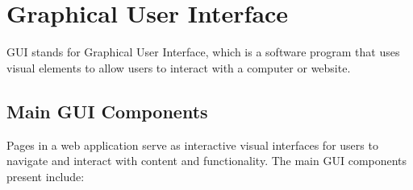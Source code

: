 \documentclass[11pt]{report}
\begin{document}
\begin{itemize}
    
\end{itemize}


\chapter{Graphical User Interface}
GUI stands for Graphical User Interface, which is a software program that uses visual elements to allow users to interact with a computer or website.

\section{Main GUI Components}
Pages in a web application serve as interactive visual interfaces for users to navigate and interact with content and functionality. The main GUI components present include:
\end{document}
